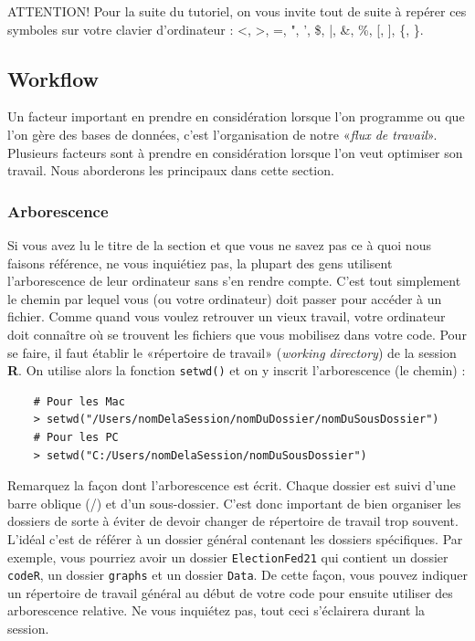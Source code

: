 \documentclass[10.5pt,a4paper]{article}
\begin{document}
ATTENTION! Pour la suite du tutoriel, on vous invite tout de suite à repérer ces symboles sur votre clavier d'ordinateur : <, >, =, ", ', \$, |, \&, \%, [, ], \{, \}.

  \subsection{Workflow}
  
  Un facteur important en prendre en considération lorsque l'on programme ou que l'on gère des bases de données, c'est l'organisation de notre «\emph{flux de travail}». Plusieurs facteurs sont à prendre en considération lorsque l'on veut optimiser son travail. Nous aborderons les principaux dans cette section.
  
    \subsubsection{Arborescence}
    Si vous avez lu le titre de la section et que vous ne savez pas ce à quoi nous faisons référence, ne vous inquiétiez pas, la plupart des gens utilisent l'arborescence de leur ordinateur sans s'en rendre compte. C'est tout simplement le chemin par lequel vous (ou votre ordinateur) doit passer pour accéder à un fichier. Comme quand vous voulez retrouver un vieux travail, votre ordinateur doit connaître où se trouvent les fichiers que vous mobilisez dans votre code. Pour se faire, il faut établir le «répertoire de travail» (\emph{working directory}) de la session \textbf{R}. On utilise alors la fonction \texttt{setwd()} et on y inscrit l'arborescence (le chemin) :
    
    \begin{lstlisting}
    # Pour les Mac
    > setwd("/Users/nomDelaSession/nomDuDossier/nomDuSousDossier")
    # Pour les PC
    > setwd("C:/Users/nomDelaSession/nomDuSousDossier")
    \end{lstlisting}
    
    Remarquez la façon dont l'arborescence est écrit. Chaque dossier est suivi d'une barre oblique (/) et d'un sous-dossier. C'est donc important de bien organiser les dossiers de sorte à éviter de devoir changer de répertoire de travail trop souvent. L'idéal c'est de référer à un dossier général contenant les dossiers spécifiques. Par exemple, vous pourriez avoir un dossier \texttt{ElectionFed21} qui contient un dossier \texttt{codeR}, un dossier \texttt{graphs} et un dossier \texttt{Data}. De cette façon, vous pouvez indiquer un répertoire de travail général au début de votre code pour ensuite utiliser des arborescence relative. Ne vous inquiétez pas, tout ceci s'éclairera durant la session.
    
\end{document}
